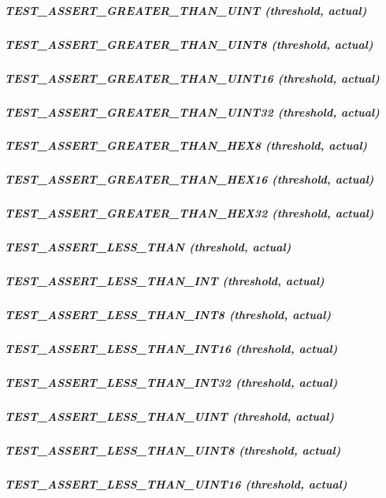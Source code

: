 \subparagraph*{{\ttfamily T\+E\+S\+T\+\_\+\+A\+S\+S\+E\+R\+T\+\_\+\+G\+R\+E\+A\+T\+E\+R\+\_\+\+T\+H\+A\+N\+\_\+\+U\+I\+NT (threshold, actual)}}

\subparagraph*{{\ttfamily T\+E\+S\+T\+\_\+\+A\+S\+S\+E\+R\+T\+\_\+\+G\+R\+E\+A\+T\+E\+R\+\_\+\+T\+H\+A\+N\+\_\+\+U\+I\+N\+T8 (threshold, actual)}}

\subparagraph*{{\ttfamily T\+E\+S\+T\+\_\+\+A\+S\+S\+E\+R\+T\+\_\+\+G\+R\+E\+A\+T\+E\+R\+\_\+\+T\+H\+A\+N\+\_\+\+U\+I\+N\+T16 (threshold, actual)}}

\subparagraph*{{\ttfamily T\+E\+S\+T\+\_\+\+A\+S\+S\+E\+R\+T\+\_\+\+G\+R\+E\+A\+T\+E\+R\+\_\+\+T\+H\+A\+N\+\_\+\+U\+I\+N\+T32 (threshold, actual)}}

\subparagraph*{{\ttfamily T\+E\+S\+T\+\_\+\+A\+S\+S\+E\+R\+T\+\_\+\+G\+R\+E\+A\+T\+E\+R\+\_\+\+T\+H\+A\+N\+\_\+\+H\+E\+X8 (threshold, actual)}}

\subparagraph*{{\ttfamily T\+E\+S\+T\+\_\+\+A\+S\+S\+E\+R\+T\+\_\+\+G\+R\+E\+A\+T\+E\+R\+\_\+\+T\+H\+A\+N\+\_\+\+H\+E\+X16 (threshold, actual)}}

\subparagraph*{{\ttfamily T\+E\+S\+T\+\_\+\+A\+S\+S\+E\+R\+T\+\_\+\+G\+R\+E\+A\+T\+E\+R\+\_\+\+T\+H\+A\+N\+\_\+\+H\+E\+X32 (threshold, actual)}}

\subparagraph*{{\ttfamily T\+E\+S\+T\+\_\+\+A\+S\+S\+E\+R\+T\+\_\+\+L\+E\+S\+S\+\_\+\+T\+H\+AN (threshold, actual)}}

\subparagraph*{{\ttfamily T\+E\+S\+T\+\_\+\+A\+S\+S\+E\+R\+T\+\_\+\+L\+E\+S\+S\+\_\+\+T\+H\+A\+N\+\_\+\+I\+NT (threshold, actual)}}

\subparagraph*{{\ttfamily T\+E\+S\+T\+\_\+\+A\+S\+S\+E\+R\+T\+\_\+\+L\+E\+S\+S\+\_\+\+T\+H\+A\+N\+\_\+\+I\+N\+T8 (threshold, actual)}}

\subparagraph*{{\ttfamily T\+E\+S\+T\+\_\+\+A\+S\+S\+E\+R\+T\+\_\+\+L\+E\+S\+S\+\_\+\+T\+H\+A\+N\+\_\+\+I\+N\+T16 (threshold, actual)}}

\subparagraph*{{\ttfamily T\+E\+S\+T\+\_\+\+A\+S\+S\+E\+R\+T\+\_\+\+L\+E\+S\+S\+\_\+\+T\+H\+A\+N\+\_\+\+I\+N\+T32 (threshold, actual)}}

\subparagraph*{{\ttfamily T\+E\+S\+T\+\_\+\+A\+S\+S\+E\+R\+T\+\_\+\+L\+E\+S\+S\+\_\+\+T\+H\+A\+N\+\_\+\+U\+I\+NT (threshold, actual)}}

\subparagraph*{{\ttfamily T\+E\+S\+T\+\_\+\+A\+S\+S\+E\+R\+T\+\_\+\+L\+E\+S\+S\+\_\+\+T\+H\+A\+N\+\_\+\+U\+I\+N\+T8 (threshold, actual)}}

\subparagraph*{{\ttfamily T\+E\+S\+T\+\_\+\+A\+S\+S\+E\+R\+T\+\_\+\+L\+E\+S\+S\+\_\+\+T\+H\+A\+N\+\_\+\+U\+I\+N\+T16 (threshold, actual)}}

